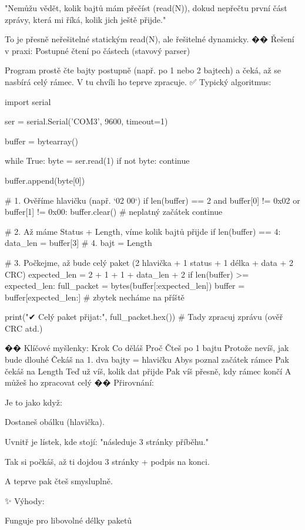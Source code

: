     "Nemůžu vědět, kolik bajtů mám přečíst (read(N)), dokud nepřečtu první část zprávy, která mi říká, kolik jich ještě přijde."

To je přesně neřešitelné statickým read(N), ale řešitelné dynamicky.
�� Řešení v praxi: Postupné čtení po částech (stavový parser)

Program prostě čte bajty postupně (např. po 1 nebo 2 bajtech) a čeká, až se nasbírá celý rámec. V tu chvíli ho teprve zpracuje.
✅ Typický algoritmus:

import serial

ser = serial.Serial('COM3', 9600, timeout=1)

buffer = bytearray()

while True:
    byte = ser.read(1)
    if not byte:
        continue

    buffer.append(byte[0])

    # 1. Ověříme hlavičku (např. `02 00`)
    if len(buffer) == 2 and buffer[0] != 0x02 or buffer[1] != 0x00:
        buffer.clear()  # neplatný začátek
        continue

    # 2. Až máme Status + Length, víme kolik bajtů přijde
    if len(buffer) == 4:
        data_len = buffer[3]  # 4. bajt = Length

    # 3. Počkejme, až bude celý paket (2 hlavička + 1 status + 1 délka + data + 2 CRC)
    expected_len = 2 + 1 + 1 + data_len + 2
    if len(buffer) >= expected_len:
        full_packet = bytes(buffer[:expected_len])
        buffer = buffer[expected_len:]  # zbytek necháme na příště

        print("✔ Celý paket přijat:", full_packet.hex())
        # Tady zpracuj zprávu (ověř CRC atd.)

�� Klíčové myšlenky:
Krok	Co děláš	Proč
Čteš po 1 bajtu	Protože nevíš, jak bude dlouhé	
Čekáš na 1. dva bajty = hlavičku	Abys poznal začátek rámce	
Pak čekáš na Length	Teď už víš, kolik dat přijde	
Pak víš přesně, kdy rámec končí	A můžeš ho zpracovat celý	
�� Přirovnání:

Je to jako když:

    Dostaneš obálku (hlavička).

    Uvnitř je lístek, kde stojí: "následuje 3 stránky příběhu."

    Tak si počkáš, až ti dojdou 3 stránky + podpis na konci.

    A teprve pak čteš smysluplně.

✨ Výhody:

    Funguje pro libovolné délky paketů

